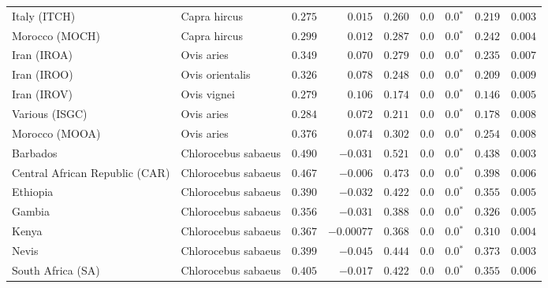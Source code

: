 \begin{center}
\begin{adjustbox}{width = 1\textwidth}
\begin{tabular}{|l|l|r|r|r|r|r|r|r|}
            Italy (ITCH)                    & Capra hircus          & $ 0.275$ & $ 0.015$   & $ 0.260$ & $0.0$    & $\bm{0.0{^*}}$ & $ 0.219$ & $ 0.003$ \\
            Morocco (MOCH)                    & Capra hircus     & $ 0.299$ & $ 0.012$   & $ 0.287$ & $0.0$    & $\bm{0.0{^*}}$ & $ 0.242$ & $ 0.004$ \\
            Iran (IROA)                    & Ovis aries         & $ 0.349$ & $ 0.070$   & $ 0.279$ & $0.0$    & $\bm{0.0{^*}}$ & $ 0.235$ & $ 0.007$ \\
            Iran (IROO)                 & Ovis orientalis          & $ 0.326$ & $ 0.078$   & $ 0.248$ & $0.0$    & $\bm{0.0{^*}}$ & $ 0.209$ & $ 0.009$ \\
            Iran (IROV)                 & Ovis vignei          & $ 0.279$ & $ 0.106$   & $ 0.174$ & $0.0$    & $\bm{0.0{^*}}$ & $ 0.146$ & $ 0.005$ \\
            Various (ISGC)                       & Ovis aries & $ 0.284$ & $ 0.072$   & $ 0.211$ & $0.0$    & $\bm{0.0{^*}}$ & $ 0.178$ & $ 0.008$ \\
            Morocco (MOOA) & Ovis aries & $ 0.376$ & $ 0.074$   & $ 0.302$ & $0.0$ & $\bm{0.0{^*}}$ & $ 0.254$ & $ 0.008$ \\
            Barbados                       & Chlorocebus sabaeus & $ 0.490$ & $-0.031$   & $ 0.521$ & $0.0$    & $\bm{0.0{^*}}$ & $ 0.438$ & $ 0.003$ \\
            Central African Republic (CAR)                         & Chlorocebus sabaeus & $ 0.467$ & $-0.006$   & $ 0.473$ & $0.0$    & $\bm{0.0{^*}}$ & $ 0.398$ & $ 0.006$ \\
            Ethiopia                          & Chlorocebus sabaeus & $ 0.390$ & $-0.032$ & $ 0.422$ & $0.0$    & $\bm{0.0{^*}}$ & $ 0.355$ & $ 0.005$ \\
            Gambia                          & Chlorocebus sabaeus & $ 0.356$ & $-0.031$   & $ 0.388$ & $0.0$    & $\bm{0.0{^*}}$ & $ 0.326$ & $ 0.005$ \\
            Kenya              & Chlorocebus sabaeus & $ 0.367$ & $-0.00077$   & $ 0.368$ & $0.0$    & $\bm{0.0{^*}}$ & $ 0.310$ & $ 0.004$ \\
            Nevis               & Chlorocebus sabaeus & $ 0.399$ & $-0.045$   & $ 0.444$ & $0.0$    & $\bm{0.0{^*}}$ & $ 0.373$ & $ 0.003$ \\
            South Africa (SA)                         & Chlorocebus sabaeus & $ 0.405$ & $-0.017$   & $ 0.422$ & $0.0$    & $\bm{0.0{^*}}$ & $ 0.355$ & $ 0.006$ \\

\end{tabular}
\end{adjustbox}
\end{center}
